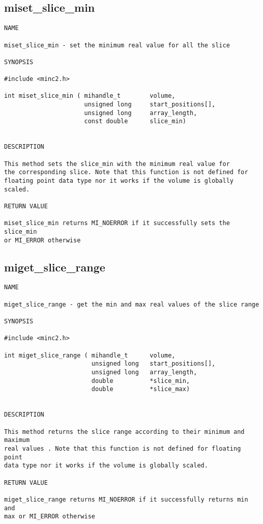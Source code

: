 \documentclass{article}
\begin{document}
\subsection{miset\_slice\_min}
\begin{verbatim}
NAME 

miset_slice_min - set the minimum real value for all the slice

SYNOPSIS

#include <minc2.h>

int miset_slice_min ( mihandle_t        volume,
                      unsigned long     start_positions[],
                      unsigned long     array_length,
                      const double      slice_min)
                       
                                
DESCRIPTION

This method sets the slice_min with the minimum real value for
the corresponding slice. Note that this function is not defined for
floating point data type nor it works if the volume is globally scaled.

RETURN VALUE

miset_slice_min returns MI_NOERROR if it successfully sets the slice_min
or MI_ERROR otherwise
\end{verbatim}

\subsection{miget\_slice\_range}
\begin{verbatim}
NAME 

miget_slice_range - get the min and max real values of the slice range

SYNOPSIS

#include <minc2.h>

int miget_slice_range ( mihandle_t      volume,
                        unsigned long   start_positions[],
                        unsigned long   array_length,
                        double          *slice_min,
                        double          *slice_max)
                       
                                
DESCRIPTION

This method returns the slice range according to their minimum and maximum
real values . Note that this function is not defined for floating point 
data type nor it works if the volume is globally scaled.

RETURN VALUE

miget_slice_range returns MI_NOERROR if it successfully returns min and
max or MI_ERROR otherwise
\end{verbatim}
\end{document}
